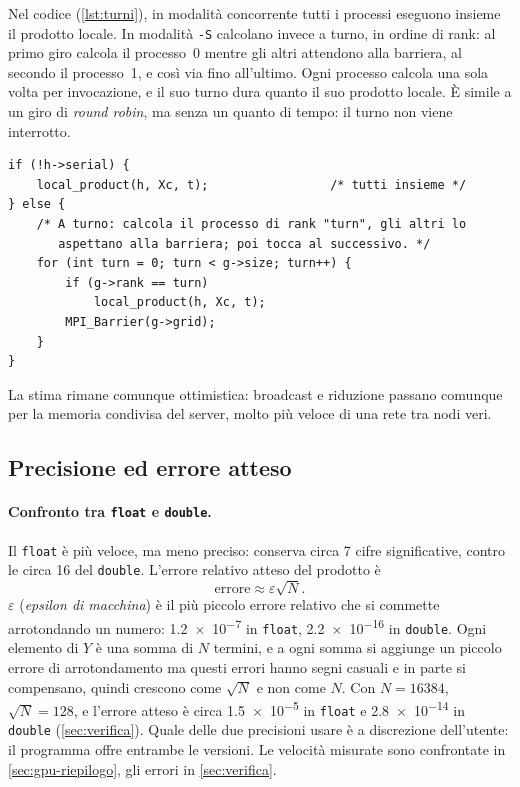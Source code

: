 \documentclass[11pt,a4paper]{article}
\begin{document}
Nel codice (\cref{lst:turni}), in modalità concorrente tutti i processi
eseguono insieme il prodotto locale. In modalità \texttt{-S} calcolano invece a
turno, in ordine di rank: al primo giro calcola il processo~0 mentre gli altri
attendono alla barriera, al secondo il processo~1, e così via fino all'ultimo.
Ogni processo calcola una sola volta per invocazione, e il suo turno dura
quanto il suo prodotto locale. È simile a un giro di \emph{round robin}, ma
senza un quanto di tempo: il turno non viene interrotto.

\begin{lstlisting}[caption={Esecuzione a turni della fase locale (\texttt{mxm.c}).}, label={lst:turni}]
if (!h->serial) {
    local_product(h, Xc, t);                 /* tutti insieme */
} else {
    /* A turno: calcola il processo di rank "turn", gli altri lo
       aspettano alla barriera; poi tocca al successivo. */
    for (int turn = 0; turn < g->size; turn++) {
        if (g->rank == turn)
            local_product(h, Xc, t);
        MPI_Barrier(g->grid);
    }
}
\end{lstlisting}

La stima rimane comunque ottimistica: broadcast e riduzione passano
comunque per la memoria condivisa del server, molto più veloce di una rete tra
nodi veri.

\subsection{Precisione ed errore atteso}\label{sec:modelli}

\paragraph{Confronto tra \texttt{float} e \texttt{double}.} Il \texttt{float} è più veloce,
ma meno preciso: conserva circa 7 cifre significative, contro le circa 16 del
\texttt{double}. L'errore relativo atteso del prodotto è
\[
  \text{errore} \approx \varepsilon \sqrt{N} .
\]
$\varepsilon$ (\emph{epsilon di macchina}) è il più piccolo errore relativo che
si commette arrotondando un numero: \num{1.2e-7} in \texttt{float},
\num{2.2e-16} in \texttt{double}. Ogni elemento di $Y$ è una somma di $N$
termini, e a ogni somma si aggiunge un piccolo errore di arrotondamento ma questi
errori hanno segni casuali e in parte si compensano, quindi crescono come
$\sqrt{N}$ e non come $N$. Con $N = 16384$, $\sqrt{N} = 128$, e l'errore atteso
è circa \num{1.5e-5} in \texttt{float} e \num{2.8e-14} in \texttt{double}
(\cref{sec:verifica}).
Quale delle due precisioni usare è a discrezione dell'utente: 
il programma offre entrambe le versioni. Le velocità misurate sono confrontate
in \cref{sec:gpu-riepilogo}, gli errori in \cref{sec:verifica}.
\end{document}
